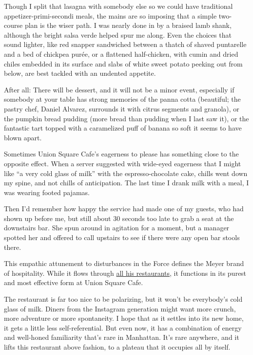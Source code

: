 Though I split that lasagna with somebody else so we could have
traditional appetizer-primi-secondi meals, the mains are so imposing
that a simple two-course plan is the wiser path. I was nearly done in by
a braised lamb shank, although the bright salsa verde helped spur me
along. Even the choices that sound lighter, like red snapper sandwiched
between a thatch of shaved puntarelle and a bed of chickpea purée, or a
flattened half-chicken, with cumin and dried chiles embedded in its
surface and slabs of white sweet potato peeking out from below, are best
tackled with an undented appetite.

After all: There will be dessert, and it will not be a minor event,
especially if somebody at your table has strong memories of the panna
cotta (beautiful; the pastry chef, Daniel Alvarez, surrounds it with
citrus segments and granola), or the pumpkin bread pudding (more bread
than pudding when I last saw it), or the fantastic tart topped with a
caramelized puff of banana so soft it seems to have blown apart.

Sometimes Union Square Cafe's eagerness to please has something close to
the opposite effect. When a server suggested with wide-eyed eagerness
that I might like ``a very cold glass of milk'' with the
espresso-chocolate cake, chills went down my spine, and not chills of
anticipation. The last time I drank milk with a meal, I was wearing
footed pajamas.

Then I'd remember how happy the service had made one of my guests, who
had shown up before me, but still about 30 seconds too late to grab a
seat at the downstairs bar. She spun around in agitation for a moment,
but a manager spotted her and offered to call upstairs to see if there
were any open bar stools there.

This empathic attunement to disturbances in the Force defines the Meyer
brand of hospitality. While it flows through
\href{http://www.ushgnyc.com/restaurants/}{all his restaurants}, it
functions in its purest and most effective form at Union Square Cafe.

The restaurant is far too nice to be polarizing, but it won't be
everybody's cold glass of milk. Diners from the Instagram generation
might want more crunch, more adventure or more spontaneity. I hope that
as it settles into its new home, it gets a little less self-referential.
But even now, it has a combination of energy and well-honed familiarity
that's rare in Manhattan. It's rare anywhere, and it lifts this
restaurant above fashion, to a plateau that it occupies all by itself.

